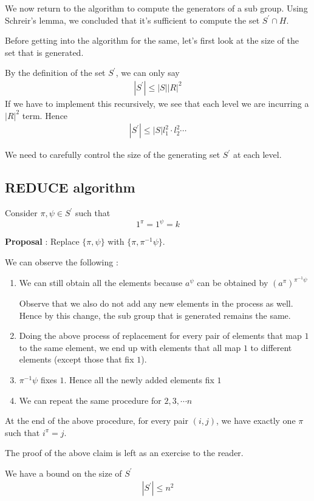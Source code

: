 
We now return to the algorithm to compute the generators
of a sub group. 
Using Schreir's lemma, we concluded that it's sufficient 
to compute the set $S^\prime \cap H$. 

Before getting into the algorithm for the same, let's first
look at the size of the set that is generated. 

By the definition of the set $S^\prime$, we can only say
\begin{align}
|S^{\prime}| \leq |S| |R|^2 
\end{align}
If we have to implement this recursively, we see
that each level we are incurring a $|R|^2$ term. 
Hence 
\begin{align}
|S^{\prime}| \leq |S| l_1^2 \cdot l_2^2 \cdots 
\end{align}

We need to carefully control the size of the generating
set $S^\prime$ at each level.

\subsection{REDUCE algorithm}

Consider $\pi, \psi \in S^\prime$ such that
$$1^\pi = 1^\psi = k$$

\textbf{Proposal} : Replace $\lbrace \pi, \psi \rbrace$ 
with $\lbrace \pi, \pi^{-1} \psi \rbrace $. 

We can observe the following : 
\begin{enumerate}

\item We can still obtain all the elements because $a^{\psi}$ can
      be obtained by $(a^{\pi})^{\pi^{-1} \psi}$

      Observe that we also do not add any new elements 
      in the process as well. Hence by this change, the 
      sub group that is generated remains the same.

\item Doing the above process of replacement for every pair
      of elements that map $1$ to the same element, 
      we end up with elements that all map $1$ to different 
      elements (except those that fix $1$).

\item $\pi^{-1}\psi$ fixes $1$. Hence all the newly added elements
      fix $1$


\item We can repeat the same procedure for $2, 3, \cdots n$ 

\end{enumerate}

\begin{claim}
At the end of the above procedure, for every pair $(i,j)$, we
have exactly one $\pi$ such that $i^{\pi} = j$.
\end{claim}
The proof of the above claim is left as an exercise
to the reader.  
\begin{corollary}
We have a bound on the size of $S^\prime$
\begin{align}
|S^\prime| \leq n^2
\end{align}

\end{corollary}
